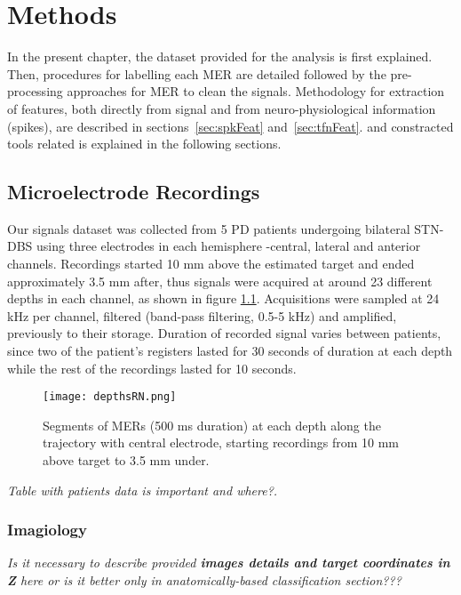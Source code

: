\chapter{Methods}

In the present chapter, the dataset provided for the analysis is first explained. Then, procedures for labelling each MER are detailed followed by the pre-processing approaches for MER to clean the signals. Methodology for extraction of features, both directly from signal and from neuro-physiological information (spikes), are described in sections~\ref{sec:spkFeat} and~\ref{sec:tfnFeat}.  and constracted tools related is explained in the following sections.  

\section{Microelectrode Recordings}

	Our signals dataset was collected from 5 PD patients undergoing bilateral STN-DBS using three electrodes in each hemisphere -central, lateral and anterior channels. Recordings started 10 mm above the estimated target and ended approximately 3.5 mm after, thus signals were acquired at around 23 different depths in each channel, as shown in figure \ref{fig:datasret}. Acquisitions were sampled at 24 kHz per channel, filtered (band-pass filtering, 0.5-5 kHz) and amplified, previously to their storage. Duration of recorded signal varies between patients, since two of the patient's registers lasted for 30 seconds of duration at each depth while the rest of the recordings lasted for 10 seconds.
	
\begin{figure}[!htb]
     \centering    
         \texttt{[image: depthsRN.png]} 

       \caption{Segments of MERs (500 ms duration) at each depth along the trajectory with central electrode, starting recordings from 10 mm above target to 3.5 mm under.}
     \label{fig:datasret}
\end{figure} 

\textit{Table with patients data is important and where?. }
\subsection{Imagiology}

\textit{Is it necessary to describe provided\textbf{ images details and target coordinates in Z} here or is it better only in anatomically-based classification section???}


